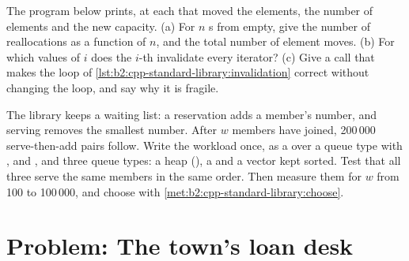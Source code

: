 \begin{exercise}[$\star\star\star$]\label{exo:b2:cpp-standard-library:11}
The program below prints, at each  that moved the elements, the number of elements and the new
capacity. (a) For $n$ s from empty, give the number of reallocations as a function of $n$, and the
total number of element moves. (b) For which values of $i$ does the $i$-th  invalidate every
iterator? (c) Give a call that makes the loop of \cref{lst:b2:cpp-standard-library:invalidation} correct without
changing the loop, and say why it is fragile.
\end{exercise}

\begin{exercise}[$\star\star\star$]\label{exo:b2:cpp-standard-library:12}
The library keeps a waiting list: a reservation adds a member's number, and serving removes the smallest number.
After $w$ members have joined, 200\,000 serve-then-add pairs follow. Write the workload once, as a  over a
queue type with ,  and , and three queue types: a heap (),
a  and a vector kept sorted. Test that all three serve the same members in the same order. Then
measure them for $w$ from 100 to 100\,000, and choose with \cref{met:b2:cpp-standard-library:choose}.
\end{exercise}

\section{Problem: The town's loan desk}\label{sec:b2:cpp-standard-library:problem}


